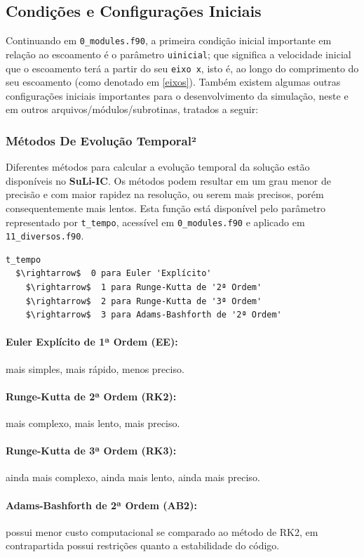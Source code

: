 \documentclass[12pt, a4paper]{article}
\newcommand{\SLIC}{{\bf SuLi-IC}}
\begin{document}

\subsection{Condições e Configurações Iniciais}
Continuando em \verb|0_modules.f90|, a primeira condição inicial importante em relação ao escoamento é o parâmetro \verb|uinicial|; que significa a velocidade inicial que o escoamento terá a partir do seu \verb|eixo x|, isto é, ao longo do comprimento do seu escoamento (como denotado em \ref{eixos}). Também existem algumas outras configurações iniciais importantes para o desenvolvimento da simulação, neste e em outros arquivos/módulos/subrotinas, tratados a seguir:


\subsubsection{Métodos De Evolução Temporal²}
Diferentes métodos para calcular a evolução temporal da solução estão disponíveis no \SLIC. Os métodos podem resultar em um grau menor de precisão e com maior rapidez na resolução, ou serem mais precisos, porém consequentemente mais lentos. Esta função está disponível pelo parâmetro representado por \verb|t_tempo|, acessível em \verb|0_modules.f90| e aplicado em \verb|11_diversos.f90|.
\begin{lstlisting}[escapeinside='']
t_tempo	
  $\rightarrow$  0 para Euler 'Explícito'
	$\rightarrow$  1 para Runge-Kutta de '2ª Ordem'
	$\rightarrow$  2 para Runge-Kutta de '3ª Ordem'
	$\rightarrow$  3 para Adams-Bashforth de '2ª Ordem'
\end{lstlisting}

\paragraph{Euler Explícito de 1ª Ordem (EE):} mais simples, mais rápido, menos preciso.
\paragraph{Runge-Kutta de 2ª Ordem (RK2):} mais complexo, mais lento, mais preciso.
\paragraph{Runge-Kutta de 3ª Ordem (RK3):} ainda mais complexo, ainda mais lento, ainda mais preciso.
\paragraph{Adams-Bashforth de 2ª Ordem (AB2):} possui menor custo computacional se comparado ao método de RK2, em contrapartida possui restrições quanto a estabilidade do código.
\end{document}

